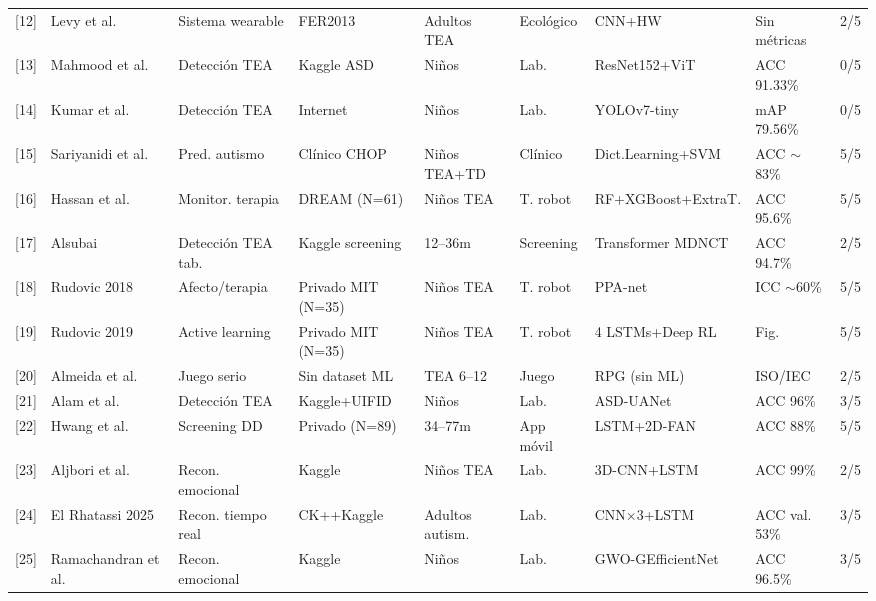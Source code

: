\documentclass[3p,twocolumn,times]{elsarticle}
\begin{document}
\begin{table}[h]
{\begin{tabular}{clllllllc}
				{[12]} & Levy et al.\        & Sistema wearable    & FER2013            & Adultos TEA     & Ecológico  & CNN+HW                & Sin métricas   & 2/5 \\
				{[13]} & Mahmood et al.\     & Detección TEA       & Kaggle ASD         & Niños           & Lab.       & ResNet152+ViT         & ACC 91.33\%    & 0/5 \\
				{[14]} & Kumar et al.\       & Detección TEA       & Internet           & Niños           & Lab.       & YOLOv7-tiny           & mAP 79.56\%    & 0/5 \\
				{[15]} & Sariyanidi et al.\  & Pred. autismo       & Clínico CHOP       & Niños TEA+TD    & Clínico    & Dict.Learning+SVM     & ACC $\sim$83\% & 5/5 \\
				{[16]} & Hassan et al.\      & Monitor. terapia    & DREAM (N=61)       & Niños TEA       & T. robot   & RF+XGBoost+ExtraT.    & ACC 95.6\%     & 5/5 \\
				{[17]} & Alsubai             & Detección TEA tab.  & Kaggle screening   & 12--36m         & Screening  & Transformer MDNCT     & ACC 94.7\%     & 2/5 \\
				{[18]} & Rudovic 2018        & Afecto/terapia      & Privado MIT (N=35) & Niños TEA       & T. robot   & PPA-net               & ICC $\sim$60\% & 5/5 \\
				{[19]} & Rudovic 2019        & Active learning     & Privado MIT (N=35) & Niños TEA       & T. robot   & 4 LSTMs+Deep RL       & Fig.           & 5/5 \\
				{[20]} & Almeida et al.\     & Juego serio         & Sin dataset ML     & TEA 6--12       & Juego      & RPG (sin ML)          & ISO/IEC        & 2/5 \\
				{[21]} & Alam et al.\        & Detección TEA       & Kaggle+UIFID       & Niños           & Lab.       & ASD-UANet             & ACC 96\%       & 3/5 \\
				{[22]} & Hwang et al.\       & Screening DD        & Privado (N=89)     & 34--77m         & App móvil  & LSTM+2D-FAN           & ACC 88\%       & 5/5 \\
				{[23]} & Aljbori et al.\     & Recon. emocional    & Kaggle             & Niños TEA       & Lab.       & 3D-CNN+LSTM           & ACC 99\%       & 2/5 \\
				{[24]} & El Rhatassi 2025    & Recon. tiempo real  & CK++Kaggle         & Adultos autism. & Lab.       & CNN$\times$3+LSTM     & ACC val. 53\%  & 3/5 \\
				{[25]} & Ramachandran et al.\ & Recon. emocional   & Kaggle             & Niños           & Lab.       & GWO-GEfficientNet     & ACC 96.5\%     & 3/5 \\

\end{tabular}}
\end{table}
\end{document}
